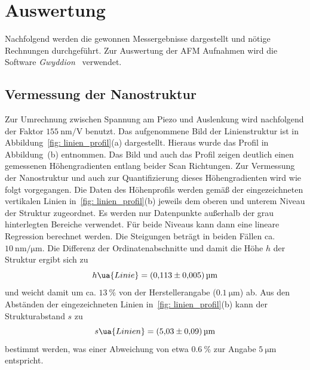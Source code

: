 \section{Auswertung}
Nachfolgend werden die gewonnen Messergebnisse dargestellt und nötige Rechnungen durchgeführt.
Zur Auswertung der AFM Aufnahmen wird die Software \textit{Gwyddion}~\cite{} verwendet.

\subsection{Vermessung der Nanostruktur}

Zur Umrechnung zwischen Spannung am Piezo und Auslenkung wird nachfolgend der Faktor
$\SI{155}{\nano\meter \per \volt}$ benutzt.
Das aufgenommene Bild der Linienstruktur ist in Abbildung~\ref{fig: linien_profil}(a) dargestellt. Hieraus wurde
das Profil in Abbildung~(b) entnommen. Das Bild und auch das Profil zeigen deutlich einen gemessenen
Höhengradienten entlang beider Scan Richtungen. Zur Vermessung der Nanostruktur und auch zur Quantifizierung
dieses Höhengradienten wird wie folgt vorgegangen. Die Daten des Höhenprofils werden gemäß der
eingezeichneten vertikalen Linien in~\ref{fig: linien_profil}(b) jeweils dem oberen und unterem
Niveau der Struktur zugeordnet. Es werden nur Datenpunkte außerhalb der grau hinterlegten Bereiche verwendet.
Für beide Niveaus kann dann eine lineare Regression berechnet werden.
Die Steigungen beträgt in beiden Fällen ca. $\SI{10}{\nano\meter\per\micro\meter}$. Die Differenz
der Ordinatenabschnitte und damit die Höhe $h$ der Struktur ergibt sich zu
\begin{equation}
  h\ua{Linie} = \SI{0.113(5)}{\micro\meter}
\end{equation}
und weicht damit um ca. $\SI{13}{\percent}$ von der Herstellerangabe ($\SI{0.1}{\micro\meter}$) ab. Aus den Abständen der eingezeichneten
Linien in~\ref{fig: linien_profil}(b) kann der Strukturabstand $s$ zu
\begin{equation}
  s\ua{Linien} = \SI{5.03(9)}{\micro\meter}
\end{equation}
bestimmt werden, was einer Abweichung von etwa $\SI{0.6}{\percent}$ zur Angabe $\SI{5}{\micro\meter}$ entspricht.
